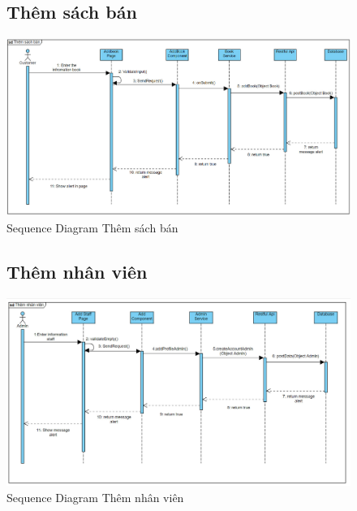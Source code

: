 \documentclass{report}
\begin{document}
\begin{center}
    \begin{figure}[htp]
        \subsection{Thêm sách bán}
        \begin{center}
            \includegraphics[scale = 0.5]{image/sequence_addBook.png}
        \end{center}
        \caption{Sequence Diagram Thêm sách bán}
    \end{figure}
\end{center}

\pagebreak

\begin{center}
    \begin{figure}[htp]
        \subsection{Thêm nhân viên}
        \begin{center}
            \includegraphics[scale = 0.5]{image/sequence_addemplyee.png}
        \end{center}
        \caption{Sequence Diagram Thêm nhân viên}
    \end{figure}
\end{center}
\end{document}
